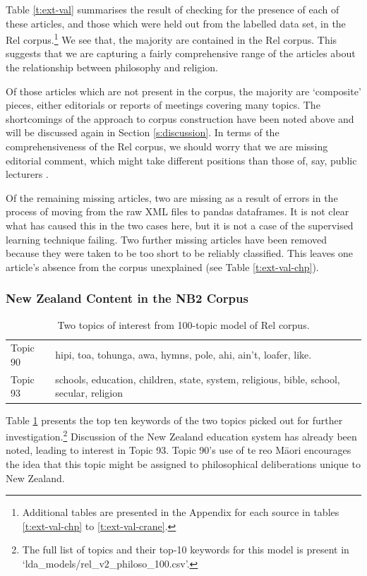 \documentclass{article}
\begin{document}
Table \ref{t:ext-val} summarises the result of checking for the presence of each of these articles, and those which were held out from the labelled data set, in the Rel corpus.\footnote{Additional tables are presented in the Appendix for each source in tables \ref{t:ext-val-chp} to \ref{t:ext-val-crane}.} We see that, the majority are contained in the Rel corpus. This suggests that we are capturing a fairly comprehensive range of the articles about the relationship between philosophy and religion.

Of those articles which are not present in the corpus, the majority are `composite' pieces, either editorials or reports of meetings covering many topics. The shortcomings of the approach to corpus construction have been noted above and will be discussed again in Section \ref{s:discussion}. In terms of the comprehensiveness of the Rel corpus, we should worry that we are missing editorial comment, which might take different positions than those of, say, public lecturers \cite[540--541]{wood-2014}. %

Of the remaining missing articles, two are missing as a result of errors in the process of moving from the raw XML files to pandas dataframes. It is not clear what has caused this in the two cases here, but it is not a case of the supervised learning technique failing. Two further missing articles have been removed because they were taken to be too short to be reliably classified. This leaves one article's absence from the corpus unexplained (see Table \ref{t:ext-val-chp}).

\subsubsection{New Zealand Content in the NB2 Corpus}

\begin{table}
  \begin{tabular}{l|l}
    Topic 90 & hipi, toa, tohunga, awa, hymns, pole, ahi, ain't, loafer, like. \\
    Topic 93 & schools, education, children, state, system, religious, bible, school, secular, religion
  \end{tabular}
  \label{t:2-topics}
  \caption{Two topics of interest from 100-topic model of Rel corpus.}
\end{table}

Table \ref{t:2-topics} presents the top ten keywords of the two topics picked out for further investigation.\footnote{The full list of topics and their top-10 keywords for this model is present in `lda\_\-models/rel\_\-v2\_\-philoso\_\-100.csv'.} Discussion of the New Zealand education system has already been noted, leading to interest in Topic 93. Topic 90's use of te reo Māori encourages the idea that this topic might be assigned to philosophical deliberations unique to New Zealand.
\end{document}
